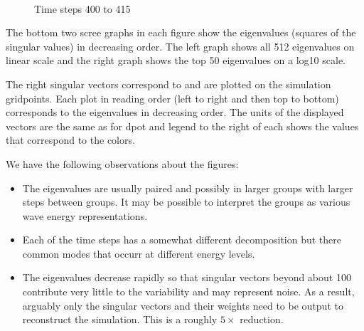 \begin{figure}[tbp]
  \begin{center}
    \\
    \\
    \\
    \\
    \\
    \\
  \caption{Time steps 400 to 415}
  \label{fig:400}
  \end{center}
\end{figure}

The bottom two scree graphs in each figure show the eigenvalues (squares of
the singular values) in decreasing order. The left graph shows all 512
eigenvalues on linear scale and the right graph shows the top 50
eigenvalues on a log10 scale.

The right singular vectors correspond to and are plotted on the
simulation gridpoints. Each plot in reading order (left to right and
then top to bottom) corresponds to the eigenvalues in decreasing
order. The units of the displayed vectors are the same as for dpot and
legend to the right of each shows the values that correspond to the
colors.

We have the following observations about the figures:
\begin{itemize}
\item The eigenvalues are usually paired and possibly in larger groups
  with larger steps between groups. It may be possible to interpret
  the groups as various wave energy representations.
\item Each of the time steps has a somewhat different decomposition
  but there common modes that occurr at different energy levels.
\item The eigenvalues decrease rapidly so that singular vectors beyond
  about 100 contribute very little to the variability and may
  represent noise. As a result, arguably only the singular vectors and
  their weights need to be output to reconstruct the simulation. This
  is a roughly $5\times$ reduction.
\end{itemize}


